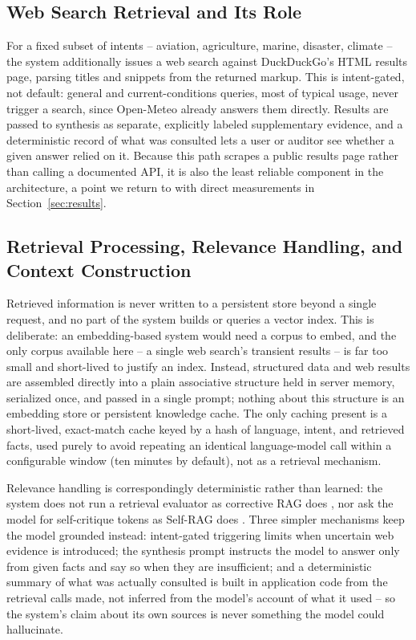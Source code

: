 \documentclass[sigconf,natbib=true,anonymous=true]{acmart}
\begin{document}
\subsection{Web Search Retrieval and Its Role}

For a fixed subset of intents -- aviation, agriculture, marine, disaster, climate -- the system additionally issues a web search against DuckDuckGo's HTML results page, parsing titles and snippets from the returned markup. This is intent-gated, not default: general and current-conditions queries, most of typical usage, never trigger a search, since Open-Meteo already answers them directly. Results are passed to synthesis as separate, explicitly labeled supplementary evidence, and a deterministic record of what was consulted lets a user or auditor see whether a given answer relied on it. Because this path scrapes a public results page rather than calling a documented API, it is also the least reliable component in the architecture, a point we return to with direct measurements in Section~\ref{sec:results}.

\subsection{Retrieval Processing, Relevance Handling, and Context Construction}

Retrieved information is never written to a persistent store beyond a single request, and no part of the system builds or queries a vector index. This is deliberate: an embedding-based system would need a corpus to embed, and the only corpus available here -- a single web search's transient results -- is far too small and short-lived to justify an index. Instead, structured data and web results are assembled directly into a plain associative structure held in server memory, serialized once, and passed in a single prompt; nothing about this structure is an embedding store or persistent knowledge cache. The only caching present is a short-lived, exact-match cache keyed by a hash of language, intent, and retrieved facts, used purely to avoid repeating an identical language-model call within a configurable window (ten minutes by default), not as a retrieval mechanism.

Relevance handling is correspondingly deterministic rather than learned: the system does not run a retrieval evaluator as corrective RAG does \citep{yan2024crag}, nor ask the model for self-critique tokens as Self-RAG does \citep{asai2024selfrag}. Three simpler mechanisms keep the model grounded instead: intent-gated triggering limits when uncertain web evidence is introduced; the synthesis prompt instructs the model to answer only from given facts and say so when they are insufficient; and a deterministic summary of what was actually consulted is built in application code from the retrieval calls made, not inferred from the model's account of what it used -- so the system's claim about its own sources is never something the model could hallucinate.
\end{document}
